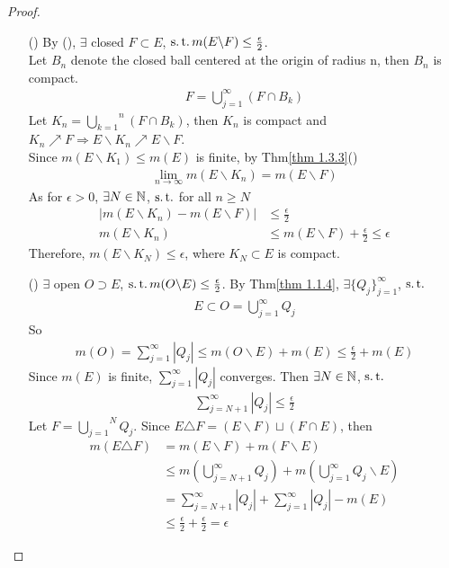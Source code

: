 \begin{thm}
\begin{proof}
\begin{enumerate}
				\item[(\rmnum{3})]By (), $\exists$ closed $F \subset E$, $\operatorname{s.t.} m(E \backslash F) \leq \frac{\epsilon}{2}$.\\
				Let $B_n$ denote the closed ball centered at the origin of radius n, then $B_n$ is compact.
				\begin{align}
					F = \bigcup_{j = 1}^{\infty}{(F \cap B_k)}
				\end{align}
				Let $K_n = \overset{n}{\underset{k = 1}{\bigcup}}{(F \cap B_k)}$, then $K_n$ is compact and $K_n \nearrow F \Rightarrow E \backslash K_n \nearrow E \backslash F$.\\
				Since $m(E \backslash K_1) \leq m(E)$ is finite, by Thm\ref{thm 1.3.3}()
				\begin{align}
					\lim_{n \to \infty}{m(E \backslash K_n)} = m(E \backslash F)
				\end{align}
				As for $\epsilon > 0$, $\exists N \in \mathbb{N}$, $\operatorname{s.t.}$ for all $n \geq N$
				\begin{align}
					\left| m(E \backslash K_n) - m(E \backslash F) \right| &\leq \frac{\epsilon}{2} \\
					m(E \backslash K_n) &\leq m(E \backslash F) + \frac{\epsilon}{2} \leq \epsilon
				\end{align}
				Therefore, $m(E \backslash K_N) \leq \epsilon$, where $K_N \subset E$ is compact.
				
				\item[(\rmnum{4})]$\exists$ open $O \supset E$, $\operatorname{s.t.} m(O \backslash E) \leq \frac{\epsilon}{2}$. By Thm\ref{thm 1.1.4}, $\exists \{ Q_j \}_{j = 1}^{\infty}$, $\operatorname{s.t.}$
				\begin{align}
					E \subset O = \bigcup_{j = 1}^{\infty}{Q_j}
				\end{align}
				So
				\begin{align}
					m(O) = \sum_{j = 1}^{\infty}{\left| Q_j \right|} \leq m(O \backslash E) + m(E) \leq \frac{\epsilon}{2} + m(E)
				\end{align}
				Since $m(E)$ is finite, $\sum_{j = 1}^{\infty}{\left| Q_j \right|}$ converges. Then $\exists N \in \mathbb{N}$, $\operatorname{s.t.}$
				\begin{align}
					\sum_{j = N + 1}^{\infty}{\left| Q_j \right|} \leq \frac{\epsilon}{2}
				\end{align}
				Let $F = \overset{N}{\underset{j = 1}{\bigcup}}{Q_j}$. Since $E \triangle F = (E \backslash F) \sqcup (F \cap E)$, then
				\begin{align}
					m(E \triangle F) 
					&= m(E \backslash F) + m(F \backslash E) \\
					&\leq m(\bigcup_{j = N + 1}^{\infty}{Q_j}) + m(\bigcup_{j = 1}^{\infty}{Q_j} \backslash E) \\ 
					&= \sum_{j = N + 1}^{\infty}{\left| Q_j \right|} + \sum_{j = 1}^{\infty}{\left| Q_j \right|} - m(E) \\
					&\leq \frac{\epsilon}{2} + \frac{\epsilon}{2} = \epsilon
				\end{align}
			\end{enumerate}
		\end{proof}
	\end{thm}

